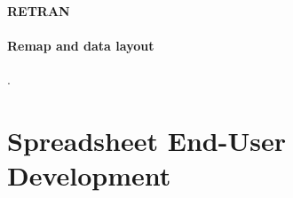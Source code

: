 \documentclass[a4paper]{article}
\begin{document}
\paragraph{RETRAN}

\cite{367042}

\paragraph{Remap and data layout}

\cite{Walinsky:1990:FPL:91556.91610, Deitz:2003:DIP:781498.781526,
  Sinkarovs:2013:SDL:2502323.2502332}.

\section{Spreadsheet End-User Development}
\label{sec:spreadsheet-end-user-dev}



\end{document}
